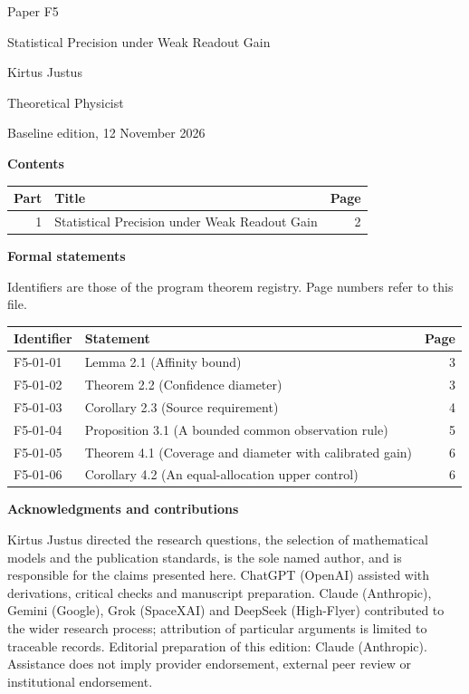 \documentclass[11pt,a4paper]{article}
\begin{document}
\thispagestyle{empty}\pagestyle{empty}
{\small\sffamily \ProgramTitle\hfill Paper F5\par}
\vspace*{12mm}
{\LARGE\bfseries\raggedright{} Statistical Precision under Weak Readout Gain\par}
\vspace{9mm}
{\large Kirtus Justus\par}\vspace{1mm}Theoretical Physicist\par\AuthorLocation\par\vspace{2mm}Baseline edition, 12 November 2026\par\vspace{8mm}
\textbf{Contents}\par\vspace{1mm}
{\small\begin{longtable}{@{}r>{\raggedright\arraybackslash}p{}r@{}}
\toprule Part & Title & Page\\\midrule\endhead
1 & Statistical Precision under Weak Readout Gain & 2\\
\bottomrule\end{longtable}}
\vspace{2mm}\textbf{Formal statements}\par\vspace{1mm}
{\footnotesize Identifiers are those of the program theorem registry. Page numbers refer to this file.\par}
{\footnotesize\begin{longtable}{@{}l>{\raggedright\arraybackslash}p{}r@{}}
\toprule Identifier & Statement & Page\\\midrule\endhead
F5-01-01 & Lemma 2.1 (Affinity bound) & 3\\
F5-01-02 & Theorem 2.2 (Confidence diameter) & 3\\
F5-01-03 & Corollary 2.3 (Source requirement) & 4\\
F5-01-04 & Proposition 3.1 (A bounded common observation rule) & 5\\
F5-01-05 & Theorem 4.1 (Coverage and diameter with calibrated gain) & 6\\
F5-01-06 & Corollary 4.2 (An equal-allocation upper control) & 6\\
\bottomrule\end{longtable}}
\vspace{3mm}\textbf{Acknowledgments and contributions}\par
{\small Kirtus Justus directed the research questions, the selection of mathematical models and the publication standards, is the sole named author, and is responsible for the claims presented here. ChatGPT (OpenAI) assisted with derivations, critical checks and manuscript preparation. Claude (Anthropic), Gemini (Google), Grok (SpaceXAI) and DeepSeek (High-Flyer) contributed to the wider research process; attribution of particular arguments is limited to traceable records. Editorial preparation of this edition: Claude (Anthropic). Assistance does not imply provider endorsement, external peer review or institutional endorsement.\par}
\end{document}
